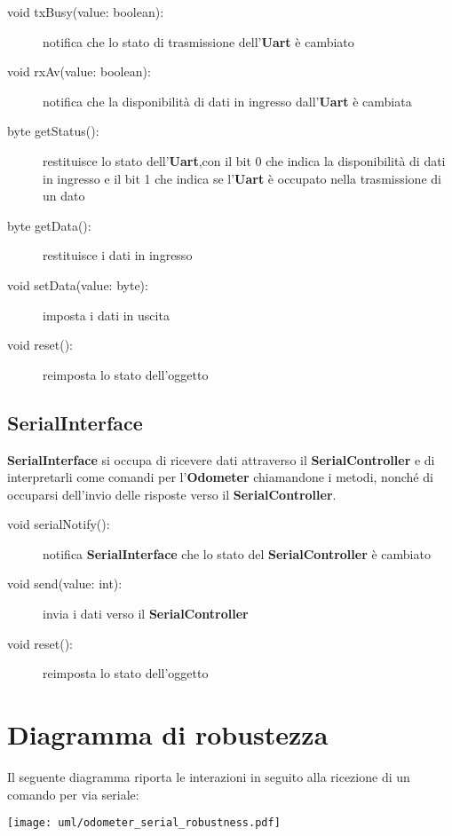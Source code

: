\documentclass [11pt,a4paper,oneside]{paper}
\newcommand{\component}[1]{\textbf{#1}}
\begin{document}
\begin{description}
\item[void txBusy(value: boolean):] notifica che lo stato di trasmissione
    dell'\component{Uart} è cambiato
\item[void rxAv(value: boolean):] notifica che la disponibilità di dati
    in ingresso dall'\component{Uart} è cambiata
\item[byte getStatus():] restituisce lo stato dell'\component{Uart},con il
    bit 0 che indica la disponibilità di dati in ingresso e il bit 1 che
    indica se l'\component{Uart} è occupato nella trasmissione di un dato
\item[byte getData():] restituisce i dati in ingresso
\item[void setData(value: byte):] imposta i dati in uscita
\item[void reset():] reimposta lo stato dell'oggetto
\end{description}

\subsection{SerialInterface}
\component{SerialInterface} si occupa di ricevere dati attraverso il
\component{SerialController} e di interpretarli come comandi per
l'\component{Odometer} chiamandone i metodi, nonché di occuparsi
dell'invio delle risposte verso il \component{SerialController}.

\begin{description}
\item[void serialNotify():] notifica \component{SerialInterface} che
    lo stato del \component{SerialController} è cambiato
\item[void send(value: int):] invia i dati verso il
    \component{SerialController}
\item[void reset():] reimposta lo stato dell'oggetto
\end{description}

\section{Diagramma di robustezza}
Il seguente diagramma riporta le interazioni in seguito alla ricezione
di un comando per via seriale:
\begin{center}
    \texttt{[image: uml/odometer\_serial\_robustness.pdf]}
    \label{serial_robustness}
\end{center}
\end{document}
